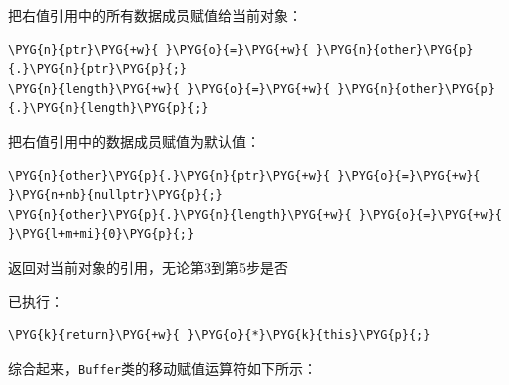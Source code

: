 
把右值引用中的所有数据成员赋值给当前对象：



\begin{codeblockbg}
\begin{Verbatim}[commandchars=\\\{\},breaklines=true,breakanywhere=true,fontsize=\codefont,xleftmargin=17bp]
\PYG{n}{ptr}\PYG{+w}{ }\PYG{o}{=}\PYG{+w}{ }\PYG{n}{other}\PYG{p}{.}\PYG{n}{ptr}\PYG{p}{;}
\PYG{n}{length}\PYG{+w}{ }\PYG{o}{=}\PYG{+w}{ }\PYG{n}{other}\PYG{p}{.}\PYG{n}{length}\PYG{p}{;}
\end{Verbatim}
\end{codeblockbg}



把右值引用中的数据成员赋值为默认值：



\begin{codeblockbg}
\begin{Verbatim}[commandchars=\\\{\},breaklines=true,breakanywhere=true,fontsize=\codefont,xleftmargin=17bp]
\PYG{n}{other}\PYG{p}{.}\PYG{n}{ptr}\PYG{+w}{ }\PYG{o}{=}\PYG{+w}{ }\PYG{n+nb}{nullptr}\PYG{p}{;}
\PYG{n}{other}\PYG{p}{.}\PYG{n}{length}\PYG{+w}{ }\PYG{o}{=}\PYG{+w}{ }\PYG{l+m+mi}{0}\PYG{p}{;}
\end{Verbatim}
\end{codeblockbg}



返回对当前对象的引用，无论第3到第5步是否



已执行：



\begin{codeblockbg}
\begin{Verbatim}[commandchars=\\\{\},breaklines=true,breakanywhere=true,fontsize=\codefont,xleftmargin=17bp]
\PYG{k}{return}\PYG{+w}{ }\PYG{o}{*}\PYG{k}{this}\PYG{p}{;}
\end{Verbatim}
\end{codeblockbg}



综合起来，\texttt{Buffer}类的移动赋值运算符如下所示：




